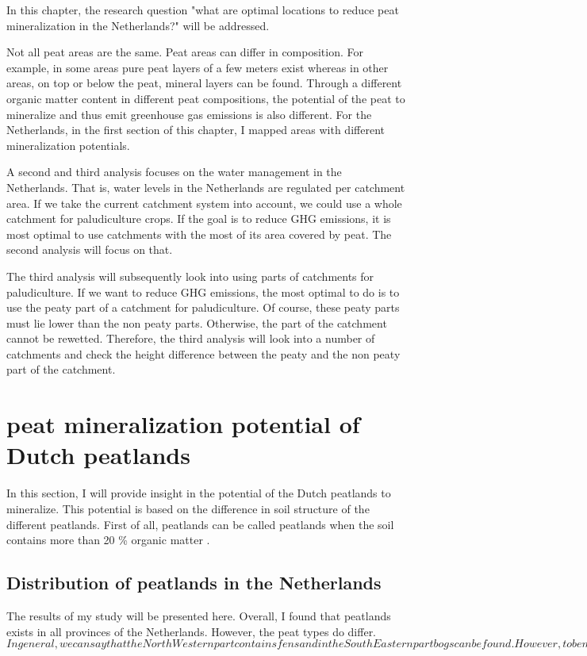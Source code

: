 \documentclass[a4paper,12pt]{scrbook}
\begin{document}
In this chapter, the research question "what are optimal locations to reduce peat mineralization in the Netherlands?" will be addressed.

Not all peat areas are the same. Peat areas can differ in composition. For example, in some areas pure peat layers of a few meters exist whereas in other areas, on top or below the peat, mineral layers can be found. Through a different organic matter content in different peat compositions, the potential of the peat to mineralize and thus emit greenhouse gas emissions is also different. For the Netherlands, in the first section of this chapter, I mapped areas with different mineralization potentials.

A second and third analysis focuses on the water management in the Netherlands. That is, water levels in the Netherlands are regulated per catchment area. If we take the current catchment system into account, we could use a whole catchment for paludiculture crops. If the goal is to reduce GHG emissions, it is most optimal to use catchments with the most of its area covered by peat. The second analysis will focus on that.

The third analysis will subsequently look into using parts of catchments for paludiculture. If we want to reduce GHG emissions, the most optimal to do is to use the peaty part of a catchment for paludiculture. Of course, these peaty parts must lie lower than the non peaty parts. Otherwise, the part of the catchment cannot be rewetted. Therefore, the third analysis will look into a number of catchments and check the height difference between the peaty and the non peaty part of the catchment.

\section{peat mineralization potential of Dutch peatlands}

In this section, I will provide insight in the potential of the Dutch peatlands to mineralize. This potential is based on the difference in soil structure of the different peatlands. First of all, peatlands can be called peatlands when the soil contains more than 20 \% organic matter \citep{}. 

\subsection{Distribution of peatlands in the Netherlands}

The results of my study will be presented here. Overall, I found that peatlands exists in all provinces of the Netherlands. However, the peat types do differ. 
$In general, we can say that the North Western part contains fens and in the South Eastern part bogs can be found. However, to be more specific, Table .. shows the distribution of the main peat types over the different provinces in the Netherlands.$
\end{document}
